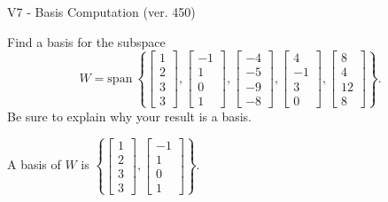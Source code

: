 \begin{exercise}
  \begin{exerciseTitle}V7 - Basis Computation (ver. 450)\end{exerciseTitle}
  \begin{exerciseStatement}
    Find a basis for the subspace 
\[W=\mathrm{span}\ \left\{\left[\begin{array}{r}
1 \\
2 \\
3 \\
3
\end{array}\right] , \left[\begin{array}{r}
-1 \\
1 \\
0 \\
1
\end{array}\right] , \left[\begin{array}{r}
-4 \\
-5 \\
-9 \\
-8
\end{array}\right] , \left[\begin{array}{r}
4 \\
-1 \\
3 \\
0
\end{array}\right] , \left[\begin{array}{r}
8 \\
4 \\
12 \\
8
\end{array}\right]\right\}.\]
 Be sure to explain why your result is a basis.


  \end{exerciseStatement}
  \begin{exerciseAnswer}
   A basis of \(W\) is  \(\left\{\left[\begin{array}{r}
1 \\
2 \\
3 \\
3
\end{array}\right] , \left[\begin{array}{r}
-1 \\
1 \\
0 \\
1
\end{array}\right]\right\}\).
  


  \end{exerciseAnswer}
\end{exercise}